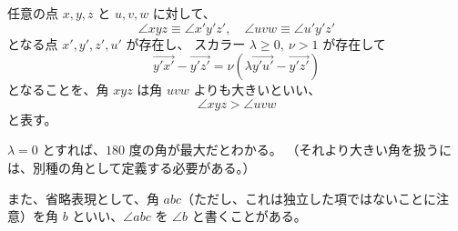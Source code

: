 
\begin{dfn}
  任意の点 \(x,y,z\) と \(u,v,w\) に対して、
  \[\angle xyz\equiv\angle x'y'z',\quad \angle uvw\equiv\angle u'y'z'\]
  となる点 \(x',y',z',u'\) が存在し、
    スカラー \(\lambda\geq 0,\ \nu>1\) が存在して
  \[\overrightarrow{y'x'}-\overrightarrow{y'z'}=\nu(\lambda\overrightarrow{y'u'}-\overrightarrow{y'z'})\]
  となることを、角 \(xyz\) は角 \(uvw\) よりも大きいといい、
  \[\angle xyz>\angle uvw\]
  と表す。
\end{dfn}

\begin{col*}
  \(\lambda=0\) とすれば、\(180\) 度の角が最大だとわかる。
  （それより大きい角を扱うには、別種の角として定義する必要がある。）
\end{col*}

また、省略表現として、角 \(abc\)（ただし、これは独立した項ではないことに注意）を角 \(b\) といい、\(\angle abc\) を \(\angle b\) と書くことがある。
